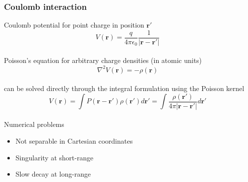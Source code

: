\documentclass[mathserif]{beamer}
\begin{document}
\begin{frame}
    \frametitle{Coulomb interaction}
    Coulomb potential for point charge in position $\boldsymbol{r}'$
    \begin{equation}
    	\nonumber
    	V(\boldsymbol{r}) = \frac{q}{4\pi\epsilon_0}
    	\frac{1}{|\boldsymbol{r}-\boldsymbol{r'}|}
    \end{equation}
    \ \\
    Poisson's equation for arbitrary charge densities (in atomic units)
    \begin{equation}
	\nonumber
    	\nabla^2 V(\boldsymbol{r}) = -\rho(\boldsymbol{r})
    \end{equation}
    \ \\
    can be solved directly through the integral formulation using the Poisson kernel
    \begin{equation}
	\nonumber
	V(\boldsymbol{r}) = 
	\int P(\boldsymbol{r}-\boldsymbol{r'})\rho(\boldsymbol{r'}) d\boldsymbol{r'} =
	\int\frac{\rho(\boldsymbol{r'})}{4\pi|\boldsymbol{r} - \boldsymbol{r'}|} d\boldsymbol{r'} 
    \end{equation}
    \ \\
    \pause
    Numerical problems
    \begin{itemize}
	\item Not separable in Cartesian coordinates
	\item Singularity at short-range
	\item Slow decay at long-range
    \end{itemize}
\end{frame}
\end{document}
